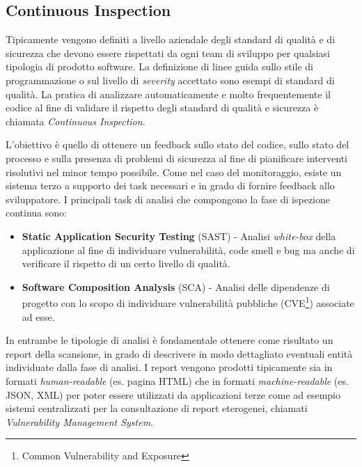 \subsection{Continuous Inspection}
Tipicamente vengono definiti a livello aziendale degli standard di qualità e di sicurezza che devono essere rispettati da ogni team di sviluppo per qualsiasi tipologia di prodotto software. La definizione di linee guida sullo stile di programmazione o sul livello di \textit{severity} accettato sono esempi di standard di qualità. La pratica di analizzare automaticamente e molto frequentemente il codice al fine di validare il rispetto degli standard di qualità e sicurezza è chiamata \textit{Continuous
Inspection}.

L’obiettivo è quello di ottenere un feedback sullo stato del codice, sullo stato
del processo e sulla presenza di problemi di sicurezza al fine di pianificare interventi
risolutivi nel minor tempo possibile. Come nel caso del monitoraggio, esiste un sistema terzo a supporto dei task necessari e in grado di fornire feedback allo sviluppatore. I principali task di analisi che compongono la fase di ispezione continua sono:

\begin{itemize}
    \item \textbf{Static Application Security Testing} (SAST) - Analisi \textit{white-box} della applicazione al fine di individuare vulnerabilità, code smell e bug ma anche di verificare il rispetto di un certo livello di qualità.
    \item \textbf{Software Composition Analysis} (SCA) - Analisi delle dipendenze di progetto con lo scopo di individuare vulnerabilità pubbliche (CVE\footnote{Common Vulnerability and Exposure}) associate ad esse.
\end{itemize}

In entrambe le tipologie di analisi è fondamentale ottenere come risultato un report della scansione, in grado di descrivere in modo dettagliato eventuali entità individuate dalla fase di analisi. I report vengono prodotti tipicamente sia in formati \textit{human-readable} (es. pagina HTML) che in formati \textit{machine-readable} (es. JSON, XML) per poter essere utilizzati da applicazioni terze come ad esempio sistemi centralizzati per la consultazione di report eterogenei, chiamati \textit{Vulnerability Management System}.

